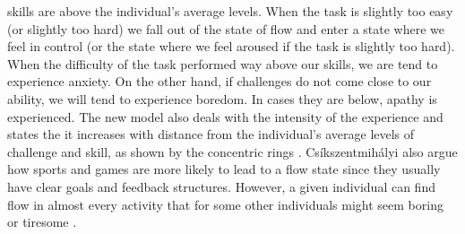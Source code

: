 skills are above the individual's average levels. When the task is slightly too easy (or slightly too hard) we fall out of the state of flow and enter a state where we feel in control (or the state where we feel aroused if the task is slightly too hard). When the difficulty of the task performed way above our skills, we are tend to experience anxiety. On the other hand, if challenges do not come close to our ability, we will tend to experience boredom. In cases they are below, apathy is experienced. The new model also deals with the intensity of the experience and states the it increases with distance from the individual's average levels of challenge and skill, as shown by the concentric rings \cite{nakamura2014concept}.
Cs\'{i}kszentmih\'{a}lyi also argue how sports and games are more likely to lead to a flow state since they usually have clear goals and feedback structures. However, a given individual can find flow in almost every activity that for some other individuals might seem boring or tiresome \cite{csikszentmihalyi2014flow}.
